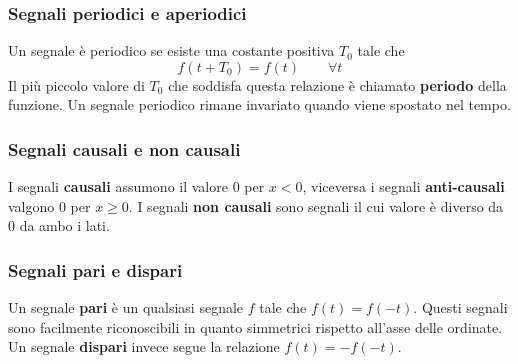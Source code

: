 \documentclass[a4paper, titlepage]{article}
\begin{document}

\subsubsection{Segnali periodici e aperiodici}
Un segnale è periodico se esiste una costante positiva $T_{0}$ tale che
$$
	f(t+T_{0})=f(t) \qquad \forall t
$$
Il più piccolo valore di $T_{0}$ che soddisfa questa relazione è chiamato \textbf{periodo} della funzione. Un segnale periodico rimane invariato quando viene spostato
nel tempo.

\subsubsection{Segnali causali e non causali}
I segnali \textbf{causali} assumono il valore $0$ per $x<0$, viceversa i segnali \textbf{anti-causali} valgono $0$ per $x\geq0$.
I segnali \textbf{non causali} sono segnali il cui valore è diverso da $0$ da ambo i lati.

\subsubsection{Segnali pari e dispari}
Un segnale \textbf{pari} è un qualsiasi segnale $f$ tale che $f(t)=f(-t)$. Questi segnali sono facilmente riconoscibili in quanto simmetrici rispetto all'asse delle ordinate.
Un segnale \textbf{dispari} invece segue la relazione $f(t)=-f(-t)$.

\begin{center}
\end{center}
\end{document}
